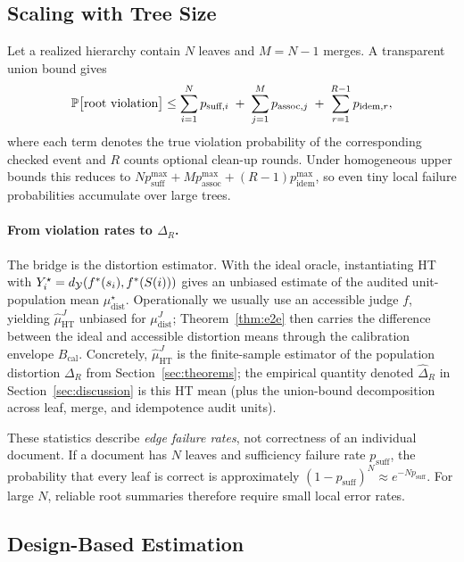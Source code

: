 \subsection{Scaling with Tree Size}

Let a realized hierarchy contain $N$ leaves and $M = N-1$ merges. A transparent union bound gives
\begin{equation}\label{eq:error_budget}
\mathbb{P}\big[\text{root violation}\big]
\le
\sum_{i=1}^{N} p_{\text{suff},i}
\;+\;
\sum_{j=1}^{M} p_{\text{assoc},j}
\;+\;
\sum_{r=1}^{R-1} p_{\text{idem},r},
\end{equation}
where each term denotes the true violation probability of the corresponding checked event and $R$ counts optional clean-up rounds. Under homogeneous upper bounds this reduces to $N p_{\text{suff}}^{\max}+M p_{\text{assoc}}^{\max}+(R-1)p_{\text{idem}}^{\max}$, so even tiny local failure probabilities accumulate over large trees.

\paragraph{From violation rates to $\Delta_R$.}
The bridge is the distortion estimator. With the ideal oracle, instantiating HT with $Y_i^\star=d_{\mathcal{Y}}(f^\ast(s_i),f^\ast(S(i)))$ gives an unbiased estimate of the audited unit-population mean $\mu_{\mathrm{dist}}^\star$. Operationally we usually use an accessible judge $f$, yielding $\hat{\mu}_{\mathrm{HT}}^{J}$ unbiased for $\mu_{\mathrm{dist}}^{J}$; Theorem~\ref{thm:e2e} then carries the difference between the ideal and accessible distortion means through the calibration envelope $B_{\mathrm{cal}}$. Concretely, $\hat{\mu}_{\mathrm{HT}}^{J}$ is the finite-sample estimator of the population distortion $\Delta_R$ from Section~\ref{sec:theorems}; the empirical quantity denoted $\hat\Delta_R$ in Section~\ref{sec:discussion} is this HT mean (plus the union-bound decomposition across leaf, merge, and idempotence audit units).

These statistics describe \emph{edge failure rates}, not correctness of an individual document. If a document has $N$ leaves and sufficiency failure rate $p_{\text{suff}}$, the probability that every leaf is correct is approximately $(1-p_{\text{suff}})^N \approx e^{-Np_{\text{suff}}}$. For large $N$, reliable root summaries therefore require small local error rates.

\subsection{Design-Based Estimation}


